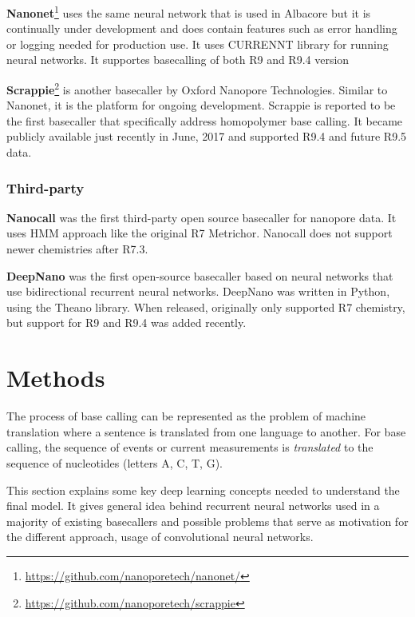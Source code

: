 \documentclass[times, utf8, diplomski, numeric, english]{fer}
\begin{document}
\textbf{Nanonet}\footnote{\url{https://github.com/nanoporetech/nanonet/}} uses the same neural network that is used in Albacore but it is continually under development and does contain features such as error handling or logging needed for production use. It uses CURRENNT library for running neural networks. It supportes basecalling of both R9 and R9.4 version 


\textbf{Scrappie}\footnote{\url{https://github.com/nanoporetech/scrappie}} is another basecaller by Oxford Nanopore Technologies. Similar to Nanonet, it is the platform for ongoing development. Scrappie is reported to be the first basecaller  that specifically address homopolymer base calling. It became publicly available just recently in June, 2017 and supported R9.4 and future R9.5 data.

\subsection{Third-party}

\textbf{Nanocall}\cite{David046086} was the first third-party open source basecaller for nanopore data. It uses HMM approach like the original R7 Metrichor. Nanocall does not support newer chemistries after R7.3.


\textbf{DeepNano}\cite{Boza2017}  was the first open-source basecaller based on neural networks that use bidirectional recurrent neural networks. DeepNano was written in Python, using the Theano library. When released, originally only supported R7 chemistry, but support for R9 and R9.4 was added recently.



\chapter{Methods}
The process of base calling can be represented as the problem of machine translation where a sentence is translated from one language to another. For base calling, the sequence of events or current measurements is \textit{translated} to the sequence of nucleotides (letters A, C, T, G).

This section explains some key  deep learning concepts needed to understand the final model. It gives general idea behind recurrent neural networks used in a majority of existing basecallers and possible problems that serve as motivation for the different approach, usage of convolutional neural networks. 
\end{document}
